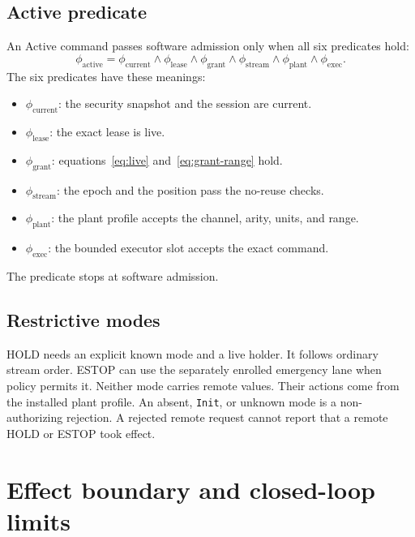 \documentclass[11pt,a4paper]{article}
\theoremstyle{definition}
\let\NcpTextttBase\texttt
\renewcommand{\texttt}[1]{\mbox{\NcpTextttBase{#1}}}
\begin{document}
\subsection{Active predicate}

An Active command passes software admission only when all six predicates hold:
\begin{equation}\label{eq:active}
\phi_{\mathrm{active}}=\phi_{\mathrm{current}}\land\phi_{\mathrm{lease}}
\land\phi_{\mathrm{grant}}\land\phi_{\mathrm{stream}}\land\phi_{\mathrm{plant}}
\land\phi_{\mathrm{exec}}.
\end{equation}
The six predicates have these meanings:
\begin{itemize}[leftmargin=*]
  \item $\phi_{\mathrm{current}}$: the security snapshot and the session are current.
  \item $\phi_{\mathrm{lease}}$: the exact lease is live.
  \item $\phi_{\mathrm{grant}}$: equations~\eqref{eq:live} and~\eqref{eq:grant-range}
        hold.
  \item $\phi_{\mathrm{stream}}$: the epoch and the position pass the no-reuse checks.
  \item $\phi_{\mathrm{plant}}$: the plant profile accepts the channel, arity, units, and
        range.
  \item $\phi_{\mathrm{exec}}$: the bounded executor slot accepts the exact command.
\end{itemize}
The predicate stops at software admission.

\subsection{Restrictive modes}

HOLD needs an explicit known mode and a live holder. It follows ordinary stream order.
ESTOP can use the separately enrolled emergency lane when policy permits it. Neither
mode carries remote values. Their actions come from the installed plant profile. An
absent, \texttt{Init}, or unknown mode is a non-authorizing rejection. A rejected remote
request cannot report that a remote HOLD or ESTOP took effect.

\section{Effect boundary and closed-loop limits}
\end{document}
